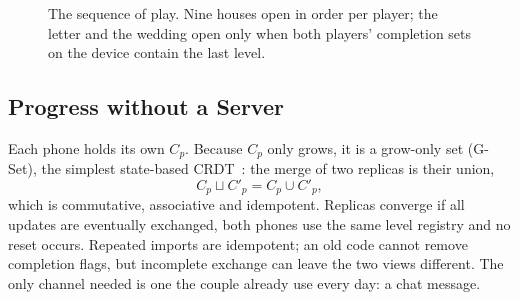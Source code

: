 \documentclass[sigconf,nonacm]{acmart}
\begin{document}
\begin{figure}[t]
  \caption{The sequence of play. Nine houses open in order per player; the letter and the wedding
  open only when both players' completion sets on the device contain the last level.}
  \label{fig:chain}
\end{figure}

\subsection{Progress without a Server}
Each phone holds its own $C_p$. Because $C_p$ only grows, it is a grow-only set (G-Set), the
simplest state-based CRDT~\cite{shapiro2011crdt}: the merge of two replicas is their union,
\begin{equation}\label{eq:merge}
  C_p \sqcup C'_p = C_p \cup C'_p ,
\end{equation}
which is commutative, associative and idempotent. Replicas converge if all updates are eventually exchanged, both phones use the same
level registry and no reset occurs. Repeated imports are idempotent; an old code cannot remove
completion flags, but incomplete exchange can leave the two views different. The
only channel needed is one the couple already use every day: a chat message.
\end{document}
